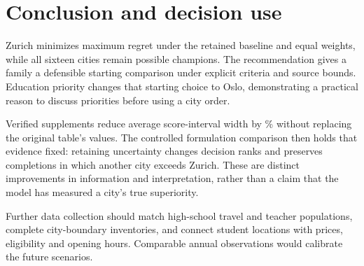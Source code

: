 \section{Conclusion and decision use}
Zurich minimizes maximum regret under the retained baseline and equal weights,
while all sixteen cities remain possible champions. The recommendation gives a
family a defensible starting comparison under explicit criteria and source
bounds. Education priority changes that starting choice to Oslo, demonstrating
a practical reason to discuss priorities before using a city order.

Verified supplements reduce average score-interval width by \TotalWidthReduction\% without
replacing the original table's values. The controlled formulation comparison
then holds that evidence fixed: retaining uncertainty changes \RevisionRankChanges{} decision
ranks and preserves completions in which another city exceeds Zurich. These
are distinct improvements in information and interpretation, rather than a
claim that the model has measured a city's true superiority.

Further data collection should match high-school travel and teacher
populations, complete city-boundary inventories, and connect student locations
with prices, eligibility and opening hours. Comparable annual observations
would calibrate the future scenarios.
